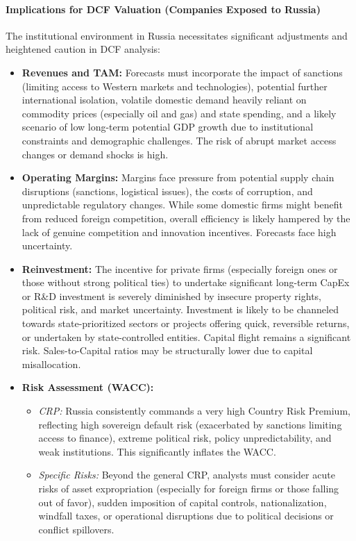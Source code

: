 \paragraph{Implications for DCF Valuation (Companies Exposed to Russia)}
The institutional environment in Russia necessitates significant adjustments and heightened caution in DCF analysis:
\begin{itemize}
    \item \textbf{Revenues and TAM:} Forecasts must incorporate the impact of sanctions (limiting access to Western markets and technologies), potential further international isolation, volatile domestic demand heavily reliant on commodity prices (especially oil and gas) and state spending, and a likely scenario of low long-term potential GDP growth due to institutional constraints and demographic challenges. The risk of abrupt market access changes or demand shocks is high.
    \item \textbf{Operating Margins:} Margins face pressure from potential supply chain disruptions (sanctions, logistical issues), the costs of corruption, and unpredictable regulatory changes. While some domestic firms might benefit from reduced foreign competition, overall efficiency is likely hampered by the lack of genuine competition and innovation incentives. Forecasts face high uncertainty.
    \item \textbf{Reinvestment:} The incentive for private firms (especially foreign ones or those without strong political ties) to undertake significant long-term CapEx or R\&D investment is severely diminished by insecure property rights, political risk, and market uncertainty. Investment is likely to be channeled towards state-prioritized sectors or projects offering quick, reversible returns, or undertaken by state-controlled entities. Capital flight remains a significant risk. Sales-to-Capital ratios may be structurally lower due to capital misallocation.
    \item \textbf{Risk Assessment (WACC):}
          \begin{itemize}
              \item \textit{CRP:} Russia consistently commands a very high Country Risk Premium, reflecting high sovereign default risk (exacerbated by sanctions limiting access to finance), extreme political risk, policy unpredictability, and weak institutions. This significantly inflates the WACC.
              \item \textit{Specific Risks:} Beyond the general CRP, analysts must consider acute risks of asset expropriation (especially for foreign firms or those falling out of favor), sudden imposition of capital controls, nationalization, windfall taxes, or operational disruptions due to political decisions or conflict spillovers.

\end{itemize}
\end{itemize}
